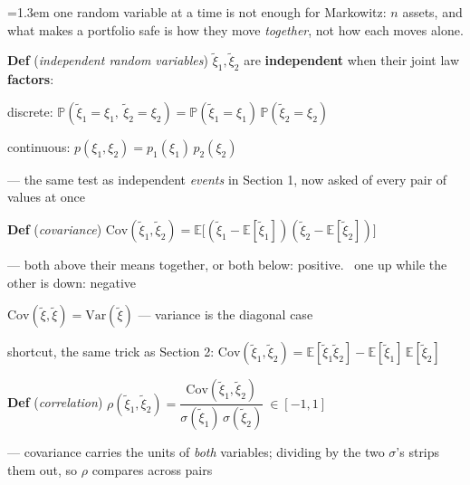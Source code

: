 \documentclass[10pt]{article}
\newenvironment{board}{%
  \par\vspace{4pt}
  \begingroup\leftskip=1.3em\relax\parskip=2pt\relax}{%
  \par\endgroup\vspace{4pt}}
\begin{document}
\begin{board}
one random variable at a time is not enough for Markowitz: $n$ assets, and what makes a portfolio
safe is how they move \emph{together}, not how each moves alone.
\vspace{10pt}

\textbf{Def} (\emph{independent random variables}) \quad $\tilde\xi_1, \tilde\xi_2$ are \textbf{independent}
when their joint law \textbf{factors}:
\vspace{4pt}

\quad discrete: \quad $\mathbb{P}(\tilde\xi_1 = \xi_1, \ \tilde\xi_2 = \xi_2)
      = \mathbb{P}(\tilde\xi_1 = \xi_1)\, \mathbb{P}(\tilde\xi_2 = \xi_2)$
\vspace{3pt}

\quad continuous: \quad $p(\xi_1, \xi_2) = p_1(\xi_1)\, p_2(\xi_2)$
\vspace{3pt}

\quad --- the same test as independent \emph{events} in Section 1, now asked of every pair of values at once
\vspace{12pt}

\textbf{Def} (\emph{covariance}) \quad
$\mathrm{Cov}(\tilde\xi_1, \tilde\xi_2) = \mathbb{E}\big[(\tilde\xi_1 - \mathbb{E}[\tilde\xi_1])
 (\tilde\xi_2 - \mathbb{E}[\tilde\xi_2])\big]$
\vspace{4pt}

\quad --- both above their means together, or both below: positive. \ one up while the other is down: negative
\vspace{3pt}

\quad $\mathrm{Cov}(\tilde\xi, \tilde\xi) = \mathrm{Var}(\tilde\xi)$ \quad --- variance is the diagonal case
\vspace{3pt}

\quad shortcut, the same trick as Section 2: \quad
$\mathrm{Cov}(\tilde\xi_1, \tilde\xi_2) = \mathbb{E}[\tilde\xi_1 \tilde\xi_2]
 - \mathbb{E}[\tilde\xi_1]\, \mathbb{E}[\tilde\xi_2]$
\vspace{12pt}

\textbf{Def} (\emph{correlation}) \quad
$\rho(\tilde\xi_1, \tilde\xi_2) = \dfrac{\mathrm{Cov}(\tilde\xi_1, \tilde\xi_2)}
 {\sigma(\tilde\xi_1)\, \sigma(\tilde\xi_2)} \ \in [-1, 1]$
\vspace{4pt}

\quad --- covariance carries the units of \emph{both} variables; dividing by the two $\sigma$'s strips them out,
      so $\rho$ compares across pairs
\vspace{12pt}


\end{board}
\end{document}
